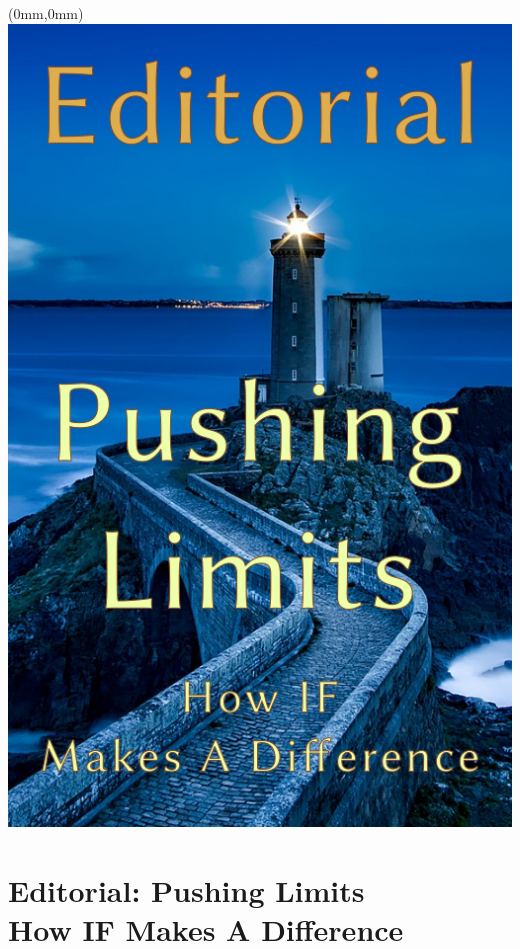 \documentclass[11.75pt,openany,final]{memoir}
\begin{document}
\thispagestyle{empty} %
\newpage
\chapter*{}
\begin{textblock*}{70.9mm}(0mm,0mm)
\includegraphics[width=\paperwidth]{./media/images/editorial_splash}
\end{textblock*}
\clearpage
\chapter{Editorial: Pushing Limits\\ \small{How IF Makes A Difference}}

\end{document}
